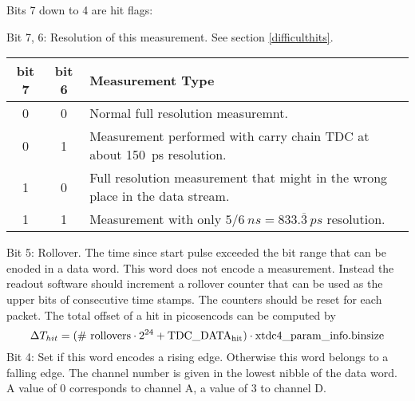 	\label{flags}
	Bits 7 down to 4 are hit flags:\par
	 {
		Bit 7, 6: Resolution of this measurement. See section \ref{difficulthits}.\\
		\noindent
		\begin{small}
		\begin{tabular}{|c|c||l|}
			\hline
			bit 7 & bit 6 & Measurement Type \\\hline\hline
			0 & 0 &  Normal full resolution measuremnt.\\\hline
			0 & 1 &  Measurement performed with carry chain TDC at about 150~ps resolution.\\\hline
			1 & 0 &  Full resolution measurement that might in the wrong place in the data stream.\\\hline
			1 & 1 &  Measurement with only $5/6~ns = 833.\overline{3}~ps$ resolution. \\\hline
		\end{tabular}
		\end{small}
		
	}
	Bit 5: Rollover. The time since start pulse exceeded the  bit range that can be enoded in a data word. This word does not encode a measurement. 
	Instead the readout software should increment a rollover counter that can be used as the upper bits of consecutive time stamps.  The counters should be reset for each packet.
	The total offset of a hit in picosencods can be computed by
	\[	\Delta T_{hit} = \mathrm{(\#\ rollovers \cdot 2^{\itett{23}{24}} + TDC\_ DATA_{hit}) \cdot \itett{timetagger4}{xtdc4}\_param\_info.binsize} \]
	\indent
	Bit 4: Set if this word encodes a rising edge. Otherwise this word belongs to a falling edge.
	The channel number is given in the lowest nibble of the data word. A value of 0 corresponds to channel A, a value of 3 to channel D.\par
